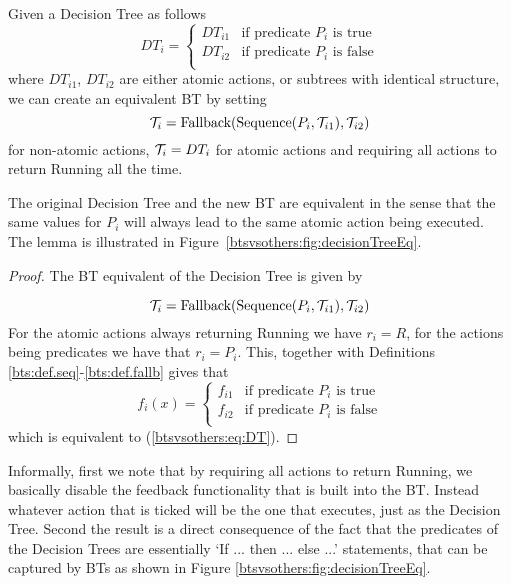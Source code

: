 \begin{lemma}
\label{btsvsothers:lem:DTBT}
 Given a Decision Tree as follows
 \begin{equation}
 \label{btsvsothers:eq:DT}
DT_i = \begin{cases}
DT_{i1} & \mbox{if predicate $P_i$ is true} \\ 
DT_{i2} & \mbox{if predicate $P_i$ is false} \\ 
\end{cases}
\end{equation}
where 
$DT_{i1}$, $DT_{i2}$ are either atomic actions, or subtrees with identical structure, we can create an equivalent BT by setting
 \begin{equation}
 \mathcal{T}_i=\mbox{Fallback}( \mbox{Sequence}(P_i,\mathcal{T}_{i1}),\mathcal{T}_{i2})
\end{equation}
for non-atomic actions, $ \mathcal{T}_i = DT_{i}$ for atomic actions
 and requiring all actions to return Running all the time.
 
 The original Decision Tree and the new BT are equivalent in the sense that the same
 values for $P_i$ will always lead to the same atomic action being executed.
 The lemma is illustrated in Figure~\ref{btsvsothers:fig:decisionTreeEq}.
\end{lemma}
\begin{proof}
The BT equivalent of the Decision Tree is given by

\begin{equation*}
 \mathcal{T}_i=\mbox{Fallback}( \mbox{Sequence}(P_i,\mathcal{T}_{i1}),\mathcal{T}_{i2})
\end{equation*}
For the atomic actions always returning Running we have  $r_i=R$,
for the actions being predicates we have that $r_i=P_i$.
This, together with Definitions \ref{bts:def.seq}-\ref{bts:def.fallb} gives that
\begin{equation}
f_i(x) = \begin{cases}
f_{i1} & \mbox{if predicate $P_i$ is true} \\ 
f_{i2} & \mbox{if predicate $P_i$ is false} \\ 
\end{cases}
\end{equation}
which is equivalent to (\ref{btsvsothers:eq:DT}).
\end{proof}

Informally, first we note that by requiring all actions to return Running, we basically disable the feedback functionality that is built into the BT. Instead whatever action that is ticked will be the one that executes, just as the Decision Tree.
Second the result is a direct consequence of the fact that the predicates of the Decision Trees are essentially `If ... then ... else ...' statements, that can be captured by BTs as shown in Figure \ref{btsvsothers:fig:decisionTreeEq}.



